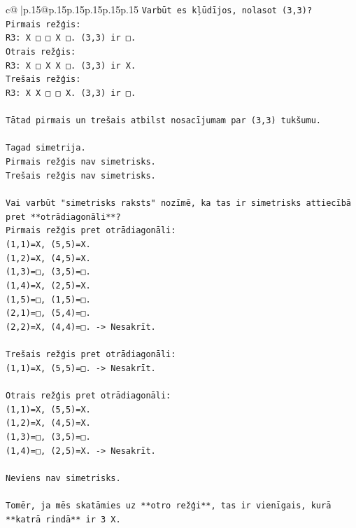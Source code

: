 \documentclass{article}
\begin{document}
{\begin{supertabular}{c@{$\;$}|p{.15\linewidth}@{}p{.15\linewidth}p{.15\linewidth}p{.15\linewidth}p{.15\linewidth}p{.15\linewidth}}
{{{\texttt{Varbūt es kļūdījos, nolasot (3,3)?} \\
\texttt{Pirmais režģis:} \\
\texttt{R3: X □ □ X □. (3,3) ir □.} \\
\texttt{Otrais režģis:} \\
\texttt{R3: X □ X X □. (3,3) ir X.} \\
\texttt{Trešais režģis:} \\
\texttt{R3: X X □ □ X. (3,3) ir □.} \\
\\ 
\texttt{Tātad pirmais un trešais atbilst nosacījumam par (3,3) tukšumu.} \\
\\ 
\texttt{Tagad simetrija.} \\
\texttt{Pirmais režģis nav simetrisks.} \\
\texttt{Trešais režģis nav simetrisks.} \\
\\ 
\texttt{Vai varbūt "simetrisks raksts" nozīmē, ka tas ir simetrisks attiecībā pret **otrādiagonāli**?} \\
\texttt{Pirmais režģis pret otrādiagonāli:} \\
\texttt{(1,1)=X, (5,5)=X.} \\
\texttt{(1,2)=X, (4,5)=X.} \\
\texttt{(1,3)=□, (3,5)=□.} \\
\texttt{(1,4)=X, (2,5)=X.} \\
\texttt{(1,5)=□, (1,5)=□.} \\
\texttt{(2,1)=□, (5,4)=□.} \\
\texttt{(2,2)=X, (4,4)=□. {-}> Nesakrīt.} \\
\\ 
\texttt{Trešais režģis pret otrādiagonāli:} \\
\texttt{(1,1)=X, (5,5)=□. {-}> Nesakrīt.} \\
\\ 
\texttt{Otrais režģis pret otrādiagonāli:} \\
\texttt{(1,1)=X, (5,5)=X.} \\
\texttt{(1,2)=X, (4,5)=X.} \\
\texttt{(1,3)=□, (3,5)=□.} \\
\texttt{(1,4)=□, (2,5)=X. {-}> Nesakrīt.} \\
\\ 
\texttt{Neviens nav simetrisks.} \\
\\ 
\texttt{Tomēr, ja mēs skatāmies uz **otro režģi**, tas ir vienīgais, kurā **katrā rindā** ir 3 X.} \\
}}}
\end{supertabular}}
\end{document}
